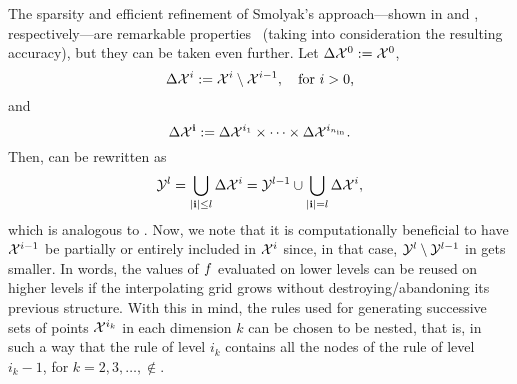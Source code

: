 The sparsity and efficient refinement of Smolyak's approach---shown in
 and , respectively---are
remarkable properties \perse\ (taking into consideration the resulting
accuracy), but they can be taken even further. Let $\Delta\mathcal{X}^0 := \mathcal{X}^0$,
\[
  \Delta\mathcal{X}^i := \mathcal{X}^i \setminus \mathcal{X}^{i - 1}, \quad \text{for $i > 0$,}
\]
and
\[
  \Delta\mathcal{X}^{\mathbf{i}} := \Delta\mathcal{X}^{i_1} \times \cdots \times \Delta\mathcal{X}^{i_{n_\text{in}}}.
\]
Then,  can be rewritten as
\begin{equation} \elab{smolyak-grid-incremental}
  \Y^l = \bigcup_{|\vi| \leq l} \Delta\X^i = \Y^{l - 1} \cup \bigcup_{|\vi| = l} \Delta\X^i,
\end{equation}
which is analogous to . Now, we note that it is
computationally beneficial to have $\mathcal{X}^{i - 1}$ be partially or entirely
included in $\mathcal{X}^i$ since, in that case, $\mathcal{Y}^l \setminus \mathcal{Y}^{l - 1}$ in
 gets smaller. In words, the values of $f$
evaluated on lower levels can be reused on higher levels if the interpolating
grid grows without destroying/abandoning its previous structure. With this in
mind, the rules used for generating successive sets of points $\mathcal{X}^{i_k}$ in each
dimension $k$ can be chosen to be nested, that is, in such a way that the rule
of level $i_k$ contains all the nodes of the rule of level $i_k - 1$, for $k =
2, 3, \dots, \nin$.

